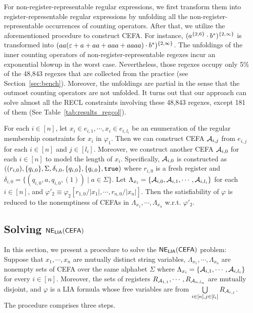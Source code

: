 For non-register-representable regular expressions, we first transform them into register-representable regular expressions by unfolding all the non-register-representable occurrences of counting operators. After that, we utilize the aforementioned procedure to construct CEFA. For instance, $(a^{\{2, 6\}} \cdot b^*)^{\{2,\infty\}}$ is transformed into $(aa(\varepsilon + a + aa + aaa+aaaa) \cdot b^*)^{\{2, \infty\}}$. 
The unfoldings of the inner counting operators of non-register-representable regexes incur an exponential blowup in the worst case. Nevertheless, those regexes occupy only 5\% of the 48,843 regexes that are collected from the practice (see Section~\ref{sec:bench}). Moreover, the unfoldings are partial in the sense that the outmost counting operators are not unfolded. 
It turns out that our approach can solve almost all the RECL constraints involving these 48,843 regexes, except 181 of them (See Table~\ref{tab:results_regcol}). 

For each $i \in [n]$, let $x_i \in e_{i, 1}, \cdots, x_i \in e_{i, l_i}$ be an enumeration of the regular membership constraints for $x_i$ in $\varphi_1$.  Then we can construct CEFA $\mathcal{A}_{i, j}$ from $e_{i, j}$ for each $i \in [n]$ and $j \in [l_i]$. Moreover, we construct another CEFA $\mathcal{A}_{i, 0}$ for each $i \in [n]$ to model the length of $x_i$. Specifically, $\mathcal{A}_{i,0}$ is constructed as $((r_{i,0}), \{q_{i,0}\}, \Sigma, \delta_{i,0}, \{q_{i,0}\}, \{q_{i,0}\}, \mathtt{true})$ where $r_{i,0}$ is a fresh register and $\delta_{i,0} = \{(q_{i,0}, a, q_{i,0}, (1)) \mid a \in \Sigma\}$. 
Let $\Lambda_{x_i} = \{\mathcal{A}_{i,0}, \mathcal{A}_{i, 1}, \cdots, \mathcal{A}_{i, l_i}\}$ for each $i \in [n]$, and $\varphi'_2 \equiv \varphi_2[r_{1,0}/|x_1|, \cdots, r_{n,0}/|x_n|]$. Then the satisfiability of $\varphi$ is reduced to the nonemptiness of CEFAs in $\Lambda_{x_1}, \cdots, \Lambda_{x_n}$ w.r.t. $\varphi'_2$.


\subsection{Solving ${\sf NE_{LIA}(CEFA)}$} \label{subsec:cefadec}

In this section, we present a procedure to solve the ${\sf NE_{LIA}(CEFA)}$ problem: Suppose that $x_1, \cdots, x_n$ are mutually distinct string variables, $\Lambda_{x_1}, \cdots, \Lambda_{x_n}$ are nonempty sets of CEFA over the same alphabet $\Sigma$ where $\Lambda_{x_i} = \{\mathcal{A}_{i, 1}, \cdots, \mathcal{A}_{i, l_i}\}$ for every $i \in [n]$. Moreover, the sets of registers $R_{\mathcal{A}_{1, 1}}, \cdots, R_{\mathcal{A}_{n, l_n}}$ are mutually disjoint, and $\varphi$ is a LIA formula whose free variables are from $\bigcup \limits_{i \in [n], j \in [l_i]} R_{\mathcal{A}_{i, j}}$. 
The procedure comprises three steps. 

